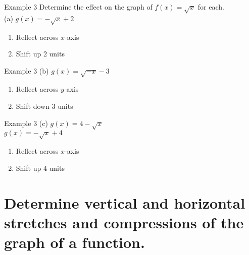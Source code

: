 \documentclass[t,usenames,dvipsnames]{beamer}
\begin{document}
\begin{frame}{Example 3}
Determine the effect on the graph of $f(x) = \sqrt{x}$ for each.    \newline\\
(a) \quad $g(x)= -\sqrt{x} + 2$ \newline\\ \pause
\begin{enumerate}
    \item Reflect across $x$-axis \newline\\    \pause
    \item Shift up 2 units
\end{enumerate}
\end{frame}

\begin{frame}{Example 3}
(b) \quad $g(x) = \sqrt{-x} - 3$ \newline\\ \pause
\begin{enumerate}
    \item Reflect across $y$-axis   \newline\\  \pause
    \item Shift down 3 units
\end{enumerate}
\end{frame}

\begin{frame}{Example 3}
(c) \quad $g(x) = 4 - \sqrt{x}$ \newline\\  \pause
$g(x) = -\sqrt{x} + 4$ \newline\\   \pause
\begin{enumerate}
    \item Reflect across $x$-axis \newline\\ \pause
    \item Shift up 4 units
\end{enumerate}
\end{frame}



\section{Determine vertical and horizontal stretches and compressions of the graph of a function.}
\end{document}
